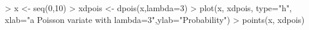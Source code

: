 \begin{Schunk}
\begin{Sinput}
> x <- seq(0,10)
> xdpois <- dpois(x,lambda=3)
> plot(x, xdpois, type="h", xlab="a Poisson variate with lambda=3",ylab="Probability")
> points(x, xdpois)
\end{Sinput}
\end{Schunk}
